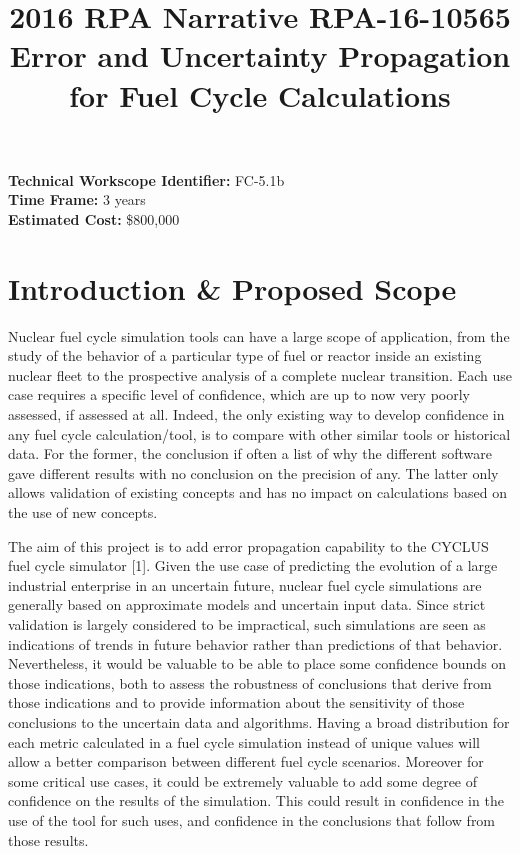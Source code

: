 \documentclass[dvips,12pt]{article}
\title{2016 RPA Narrative RPA-16-10565\\
Error and Uncertainty Propagation for Fuel Cycle Calculations}
\begin{document}
\noindent\textbf{Technical Workscope Identifier:} FC-5.1b\\
\textbf{Time Frame:} 3 years\\
\textbf{Estimated Cost:} \$800,000


\section{Introduction \& Proposed Scope}
Nuclear fuel cycle simulation tools can have a large
scope of application, from the study of the
behavior of a particular type of fuel or reactor inside an
existing nuclear fleet to the prospective analysis
of a complete nuclear transition. 
Each use case
requires a specific level
of confidence, which are up to now very
poorly assessed, if assessed at all.
Indeed, the only existing way to develop confidence in
any fuel cycle calculation/tool, is to compare
with other similar tools or historical
data.  For the former, the conclusion if often 
a list of why the different software gave
different results with no conclusion on the
precision of any.  The latter only allows
validation of existing concepts and has no impact
on calculations based on the use of new
concepts.

The aim of this project is to add error
propagation capability to the CYCLUS fuel cycle
simulator [1]. Given the use case of predicting the
evolution of a large industrial enterprise in an
uncertain future, nuclear fuel cycle simulations
are generally based on approximate models and
uncertain input data.  Since strict validation is largely
considered to be impractical, such simulations are
seen as indications of trends in future behavior rather than
predictions of that behavior. Nevertheless, it
would be valuable to be able to place some
confidence bounds on those indications, both to
assess the robustness of conclusions that derive
from those indications and to provide information
about the sensitivity of those conclusions to the
uncertain data and algorithms.  Having a broad
distribution for each metric calculated in a fuel
cycle simulation instead of unique values will
allow a better comparison between different fuel
cycle scenarios.  Moreover for some critical
use cases, it could be extremely valuable to add
some degree of confidence on the results of the simulation.
This could result in confidence in the use of the tool for
such uses, and confidence in the conclusions that follow
from those results.
\end{document}
